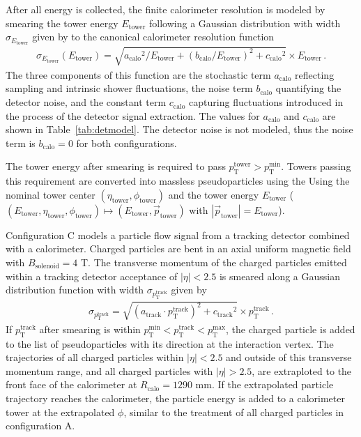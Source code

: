\documentclass[11pt,letterpaper]{article}
\newcommand{\etower}{\ensuremath{E_{\text{tower}}}}
\newcommand{\etatower}{\ensuremath{\eta_{\text{tower}}}}
\newcommand{\phitower}{\ensuremath{\phi_{\text{tower}}}}
\newcommand{\ptmin}{\ensuremath{p_{\text{T}}^{\text{min}}}}
\newcommand{\ptmax}{\ensuremath{p_{\text{T}}^{\text{max}}}}
\newcommand{\pttrk}{\ensuremath{p_{\text{T}}^{\text{track}}}}
\newcommand{\pttower}{\ensuremath{p_{\text{T}}^{\text{tower}}}}
\newcommand{\acalo}{\ensuremath{a_{\text{calo}}}}
\newcommand{\bcalo}{\ensuremath{b_{\text{calo}}}}
\newcommand{\ccalo}{\ensuremath{c_{\text{calo}}}}
\newcommand{\atrk}{\ensuremath{a_{\text{track}}}}
\newcommand{\ctrk}{\ensuremath{c_{\text{track}}}}
\begin{document}
After all energy is collected, the finite calorimeter resolution is modeled by smearing the tower energy \etower{} following a Gaussian distribution with width 
$\sigma_{\etower}$ given by to the canonical calorimeter resolution function
\begin{align}
  \sigma_{\etower}(\etower) = \sqrt{\acalo^{2}/\etower + (\bcalo/\etower)^{2} + \ccalo^{2}} \times \etower\,.
  \label{eq:caloreso}
\end{align}
The three components of this function are the stochastic term \acalo{} reflecting sampling and intrinsic shower fluctuations, the noise term \bcalo{} quantifying the detector noise, 
and the constant term \ccalo{} capturing fluctuations introduced in the process of the detector signal extraction.  
The values for \acalo{} and \ccalo{} are shown in Table~\ref{tab:detmodel}. 
The detector noise is not modeled, thus the noise term is $\bcalo=0$ for both configurations.

The tower energy after smearing is required to pass $\pttower > \ptmin$. 
Towers passing this requirement are converted into massless pseudoparticles using the 
Using the nominal tower center $(\etatower,\phitower)$ and the tower energy \etower{} ($(\etower,\etatower,\phitower) \mapsto (\etower,\vec{p}_{\text{tower}})$ with $|\vec{p}_{\text{tower}}| = \etower$).

Configuration C models a particle flow signal from a tracking detector combined with a calorimeter. 
Charged particles are bent in an axial uniform magnetic field with $B_{\text{solenoid}} = 4$ T.
The transverse momentum of the charged particles emitted within a tracking detector acceptance of $|\eta|<2.5$
is smeared along a Gaussian distribution function with width $\sigma_{\pttrk}$ given by
\begin{align}
  \sigma_{\pttrk} = \sqrt{(\atrk\cdot\pttrk)^{2} + \ctrk^{2}} \times \pttrk\,.
  \label{eq:trkreso}
\end{align} 
If \pttrk{} after smearing is within $\ptmin < \pttrk < \ptmax$, the charged particle is added to the list of pseudoparticles with its direction at the interaction vertex. 
The trajectories of all charged particles within $|\eta| < 2.5$ and outside of this transverse momentum range, 
and all charged particles with $|\eta| > 2.5$, are extraploted to the front face of the calorimeter at $R_{\text{calo}} = 1290$ mm.
If the extrapolated particle trajectory reaches the calorimeter, the particle energy is added to a calorimeter tower at the extrapolated $\phi$, similar to the treatment of all charged particles in configuration A.
\end{document}
